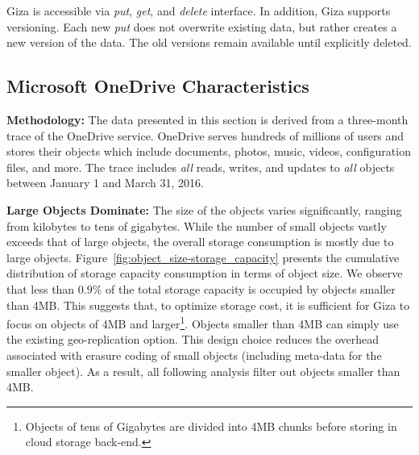 Giza is accessible via {\em put}, {\em get}, and {\em delete} interface. In
addition, Giza supports versioning. Each new {\em put} does not overwrite
existing data, but rather creates a new version of the data. The old versions
remain available until explicitly deleted.

\subsection{Microsoft OneDrive Characteristics}


{\bf Methodology:} The data presented in this section is derived from a three-month trace of the OneDrive service. OneDrive serves hundreds of millions of users and stores their objects which include documents, photos, music, videos, configuration files, and more. The trace includes {\em all} reads, writes, and updates to {\em all} objects between January 1 and March 31, 2016.

{\bf Large Objects Dominate:} The size of the objects varies significantly, ranging from kilobytes to tens of gigabytes. While the number of small objects vastly exceeds that of large objects, the overall storage consumption is mostly due to large objects. Figure~\ref{fig:object_size-storage_capacity} presents the cumulative distribution of storage capacity consumption in terms of object size. We observe that less than $0.9\%$ of the total storage capacity is occupied by objects smaller than 4MB. This suggests that, to optimize storage cost, it is sufficient for Giza to focus on objects of 4MB and larger\footnote{Objects of tens of Gigabytes are divided into 4MB chunks before storing in cloud storage back-end.}. Objects smaller than 4MB can simply use the existing geo-replication option. This design choice reduces the overhead associated with erasure coding of small objects (including meta-data for the smaller object). As a result, all following analysis filter out objects smaller than 4MB.

